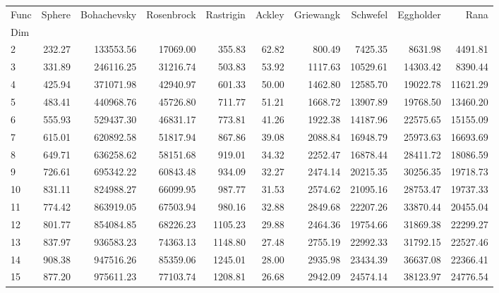 \begin{tabular}{lrrrrrrrrr}
\toprule
Func &  Sphere &  Bohachevsky &  Rosenbrock &  Rastrigin &  Ackley &  Griewangk &  Schwefel &  Eggholder &     Rana \\
Dim &         &              &             &            &         &            &           &            &          \\
\midrule
2   &  232.27 &    133553.56 &    17069.00 &     355.83 &   62.82 &     800.49 &   7425.35 &    8631.98 &  4491.81 \\
3   &  331.89 &    246116.25 &    31216.74 &     503.83 &   53.92 &    1117.63 &  10529.61 &   14303.42 &  8390.44 \\
4   &  425.94 &    371071.98 &    42940.97 &     601.33 &   50.00 &    1462.80 &  12585.70 &   19022.78 & 11621.29 \\
5   &  483.41 &    440968.76 &    45726.80 &     711.77 &   51.21 &    1668.72 &  13907.89 &   19768.50 & 13460.20 \\
6   &  555.93 &    529437.30 &    46831.17 &     773.81 &   41.26 &    1922.38 &  14187.96 &   22575.65 & 15155.09 \\
7   &  615.01 &    620892.58 &    51817.94 &     867.86 &   39.08 &    2088.84 &  16948.79 &   25973.63 & 16693.69 \\
8   &  649.71 &    636258.62 &    58151.68 &     919.01 &   34.32 &    2252.47 &  16878.44 &   28411.72 & 18086.59 \\
9   &  726.61 &    695342.22 &    60843.48 &     934.09 &   32.27 &    2474.14 &  20215.35 &   30256.35 & 19718.73 \\
10  &  831.11 &    824988.27 &    66099.95 &     987.77 &   31.53 &    2574.62 &  21095.16 &   28753.47 & 19737.33 \\
11  &  774.42 &    863919.05 &    67503.94 &     980.16 &   32.88 &    2849.68 &  22207.26 &   33870.44 & 20455.04 \\
12  &  801.77 &    854084.85 &    68226.23 &    1105.23 &   29.88 &    2464.36 &  19754.66 &   31869.38 & 22299.27 \\
13  &  837.97 &    936583.23 &    74363.13 &    1148.80 &   27.48 &    2755.19 &  22992.33 &   31792.15 & 22527.46 \\
14  &  908.38 &    947516.26 &    85359.06 &    1245.01 &   28.00 &    2935.98 &  23434.39 &   36637.08 & 22366.41 \\
15  &  877.20 &    975611.23 &    77103.74 &    1208.81 &   26.68 &    2942.09 &  24574.14 &   38123.97 & 24776.54 \\

\end{tabular}
